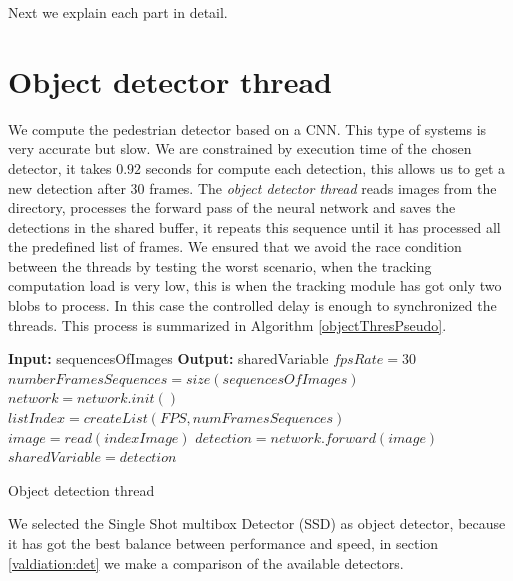 Next we explain each part in detail.

\section{Object detector thread}


We compute the pedestrian detector based on a CNN. This type of systems is very accurate but slow. We are constrained by execution time of the chosen detector, it takes $0.92$ seconds for compute each detection, this allows us to get a new detection after $30$ frames. The \textit{object detector thread} reads images from the directory, processes the forward pass of the neural network and saves the detections in the shared buffer, it repeats this sequence until it has processed all the predefined list of frames. We ensured that we avoid the race condition between the threads by testing the worst scenario, when the tracking computation load is very low, this is when the tracking module has got only two blobs to process. In this case the controlled delay is enough to synchronized the threads. This process is summarized in Algorithm \ref{objectThresPseudo}.


\begin{algorithm}
\begin{algorithmic}[1]
\State \textbf{Input:} sequencesOfImages
\State \textbf{Output:} sharedVariable
\State $fpsRate = 30$
\State $numberFramesSequences = size(sequencesOfImages)$
\State $network = network.init()$
\State $listIndex = createList(FPS,numFramesSequences)$
\State $image = read(indexImage)$
\State $detection = network.forward(image)$
\State $sharedVariable = detection$
\EndFor
\EndProcedure
\end{algorithmic}
\caption{Object detection thread}\label{objectThresPseudo}
\end{algorithm}

We selected the Single Shot multibox Detector (SSD) as object detector, because it has got the best balance between performance and speed, in section \ref{valdiation:det} we make a comparison of the available detectors. 



